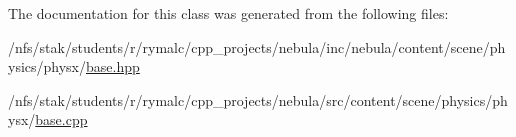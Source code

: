 The documentation for this class was generated from the following files:\begin{DoxyCompactItemize}
\item 
/nfs/stak/students/r/rymalc/cpp\_\-projects/nebula/inc/nebula/content/scene/physics/physx/\hyperlink{inc_2nebula_2content_2scene_2physics_2physx_2base_8hpp}{base.hpp}\item 
/nfs/stak/students/r/rymalc/cpp\_\-projects/nebula/src/content/scene/physics/physx/\hyperlink{src_2content_2scene_2physics_2physx_2base_8cpp}{base.cpp}\end{DoxyCompactItemize}
